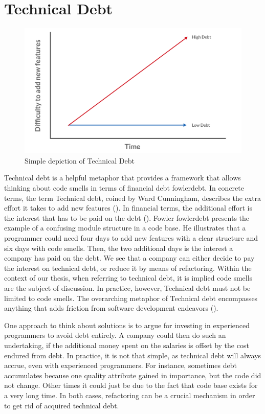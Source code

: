 \section{Technical Debt}
\begin{figure}[H]
    \centering
    \includegraphics[width=\textwidth]{./assets/technical_debt}
    \caption{Simple depiction of Technical Debt}
\end{figure}

Technical debt is a helpful metaphor 
	that provides a framework that allows thinking about code smells 
	in terms of financial debt {fowlerdebt}.
In concrete terms, the term Technical debt, coined by Ward Cunningham, describes the extra effort it takes to add new features (\cite{kruchten2012}). 
In financial terms, the additional effort is the interest that has to be paid on the debt (\cite{fowlerdebt}). 
Fowler {fowlerdebt} presents the example 
	of a confusing module structure in a code base.
He illustrates that 
	a programmer could need four days to add new features 
	with a clear structure and six days with code smells. 
Then, the two additional days is the interest a company has paid on the debt.
We see that a company can either decide to pay the interest on technical debt, 
	or reduce it by means of refactoring. 
Within the context of our thesis,
	when referring to technical debt, it is implied code smells are the subject of discussion.
In practice, however, Technical debt must not be limited to code smells. The overarching metaphor of Technical debt encompasses anything 
	that adds friction from software development endeavors (\cite{kruchten2012}). 

One approach to think about solutions is to argue for investing in experienced programmers to avoid debt entirely. 
A company could then do such an undertaking, if the additional money spent on the salaries is offset by the cost endured from debt.
In practice, it is not that simple, as technical debt will always accrue, even with experienced programmers. For instance, sometimes debt accumulates because one quality attribute gained in importance, but the code did not change. Other times it could just be due to the fact that code base exists for a very long time. In both cases, refactoring can be a crucial mechanism in order to get rid of acquired technical debt. 

